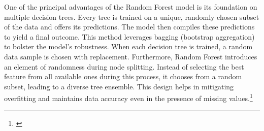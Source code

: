 \documentclass[10pt]{article}
\begin{document}
One of the principal advantages of the Random Forest model is its foundation on multiple decision trees. Every tree is trained on a unique, randomly chosen subset of the data and offers its predictions. The model then compiles these predictions to yield a final outcome. This method leverages bagging (bootstrap aggregation) to bolster the model's robustness. When each decision tree is trained, a random data sample is chosen with replacement. Furthermore, Random Forest introduces an element of randomness during node splitting. Instead of selecting the best feature from all available ones during this process, it chooses from a random subset, leading to a diverse tree ensemble. This design helps in mitigating overfitting and maintains data accuracy even in the presence of missing values.\footnote{\cite{hastie2001elements}}
\end{document}
